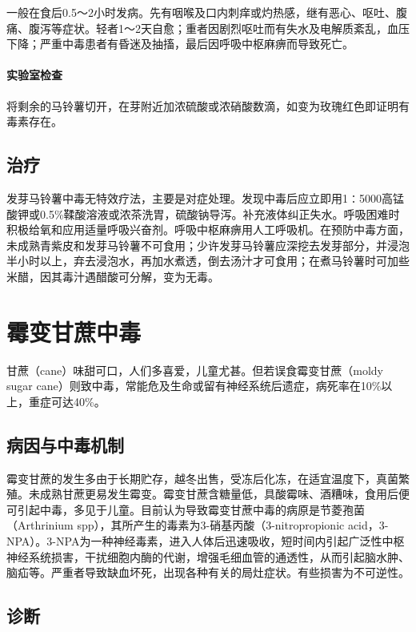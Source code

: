 一般在食后0.5～2小时发病。先有咽喉及口内刺痒或灼热感，继有恶心、呕吐、腹痛、腹泻等症状。轻者1～2天自愈；重者因剧烈呕吐而有失水及电解质紊乱，血压下降；严重中毒患者有昏迷及抽搐，最后因呼吸中枢麻痹而导致死亡。

\paragraph{实验室检查}

将剩余的马铃薯切开，在芽附近加浓硫酸或浓硝酸数滴，如变为玫瑰红色即证明有毒素存在。

\subsection{治疗}

发芽马铃薯中毒无特效疗法，主要是对症处理。发现中毒后应立即用1∶5000高锰酸钾或0.5\%鞣酸溶液或浓茶洗胃，硫酸钠导泻。补充液体纠正失水。呼吸困难时积极给氧和应用适量呼吸兴奋剂。呼吸中枢麻痹用人工呼吸机。在预防中毒方面，未成熟青紫皮和发芽马铃薯不可食用；少许发芽马铃薯应深挖去发芽部分，并浸泡半小时以上，弃去浸泡水，再加水煮透，倒去汤汁才可食用；在煮马铃薯时可加些米醋，因其毒汁遇醋酸可分解，变为无毒。

\protect\hypertarget{text00166.html}{}{}

\section{霉变甘蔗中毒}

甘蔗（cane）味甜可口，人们多喜爱，儿童尤甚。但若误食霉变甘蔗（moldy
sugar
cane）则致中毒，常能危及生命或留有神经系统后遗症，病死率在10\%以上，重症可达40\%。

\subsection{病因与中毒机制}

霉变甘蔗的发生多由于长期贮存，越冬出售，受冻后化冻，在适宜温度下，真菌繁殖。未成熟甘蔗更易发生霉变。霉变甘蔗含糖量低，具酸霉味、酒糟味，食用后便可引起中毒，多见于儿童。目前认为导致霉变甘蔗中毒的病原是节菱孢菌（Arthrinium
spp），其所产生的毒素为3-硝基丙酸（3-nitropropionic
acid，3-NPA）。3-NPA为一种神经毒素，进入人体后迅速吸收，短时间内引起广泛性中枢神经系统损害，干扰细胞内酶的代谢，增强毛细血管的通透性，从而引起脑水肿、脑疝等。严重者导致缺血坏死，出现各种有关的局灶症状。有些损害为不可逆性。

\subsection{诊断}

